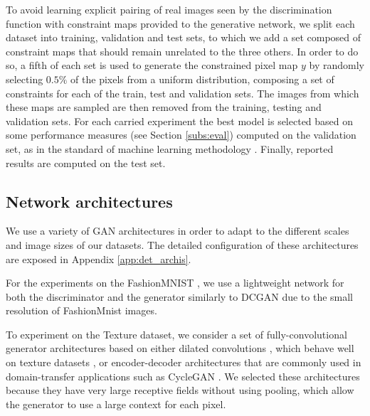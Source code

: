 To avoid learning explicit pairing of real images seen by the discrimination function with constraint maps provided to the generative network, we split each dataset into training, validation and test sets, to which we add a set composed of constraint maps that should remain unrelated to the three others.
In order to do so, a fifth of each set is used to generate the constrained pixel map $y$ by randomly selecting $0.5\%$ of the pixels from a uniform distribution, composing a set of constraints for each of the train, test and validation sets. The images from which these maps are sampled are then removed from the training, testing and validation sets. For each carried experiment the best model is selected based on some performance measures (see Section \ref{subs:eval}) computed on the validation set, as in the standard of machine learning methodology \cite{oneto2019}. Finally, reported results are computed on the test set.



\subsection{Network architectures}
\label{subs:architectures}

We use a variety of GAN architectures in order to adapt to the different scales and image sizes of our datasets. The detailed configuration of these architectures are exposed in Appendix \ref{app:det_archis}.

For the experiments on the FashionMNIST \cite{Xiao2017}, we use a lightweight network for both the discriminator and the generator similarly to DCGAN  \cite{Radford2015} due to the small resolution of FashionMnist images.

To experiment on the Texture dataset, we consider a set of fully-convolutional generator architectures based on either dilated convolutions \cite{yu2015multi}, which behave well on texture datasets \cite{ruffino2018dilated}, or encoder-decoder architectures that are commonly used in domain-transfer applications such as CycleGAN \cite{Zhu2017unpaired}. We selected these architectures because they have very large receptive fields without using pooling, which allow the generator to use a large context for each pixel.

